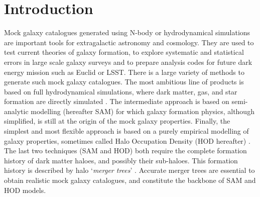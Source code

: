 \section{Introduction}

Mock galaxy catalogues generated using N-body or hydrodynamical
simulations are important tools for extragalactic astronomy and
cosmology.  They are used to test current theories of galaxy
formation, to explore systematic and statistical errors in large scale
galaxy surveys and to prepare analysis codes for future dark energy
mission such as Euclid or LSST.  There is a large variety of methods
to generate such mock galaxy catalogues.  The most ambitious line of
products is based on full hydrodynamical simulations, where dark
matter, gas, and star formation are directly simulated
\citep[e.g.][]{duboisDancingDarkGalactic2014,
  khandaiMassiveBlackIISimulationEvolution2015,
  vogelsbergerPropertiesGalaxiesReproduced2014,
  schayeEAGLEProjectSimulating2015}.
The intermediate approach is based on semi-analytic modelling
(hereafter SAM) \citep[e.g.][]{SA-white,
  SA-durham, SA-Somerville, SA-Kaufmann,
  kangSemianalyticalModelGalaxy2005,crotonManyLivesActive2006} for
which galaxy formation physics, although simplified, is still at the
origin of the mock galaxy properties. Finally, the simplest and most
flexible approach is based on a purely empirical modelling of galaxy
properties, sometimes called Halo Occupation Density (HOD hereafter)
\citep[e.g.][]{HOD-Seljak, HOD-Berlind,
  peacockHaloOccupationNumbers2000,
  bensonNatureGalaxyBias2000,wechslerGalaxyFormationConstraints2001,
  scoccimarroHowManyGalaxies2001}.
The last two techniques (SAM and HOD) both require the complete
formation history of dark matter
haloes, and possibly their sub-haloes. This formation history is
described by halo `\emph{merger trees}'
\citep{roukemaSpectralEvolutionMerging1993,
  roukemaFailureSimpleMerging1993, laceyMergerRatesHierarchical1993}.
Accurate merger trees are essential to obtain realistic mock galaxy
catalogues, and constitute the backbone of SAM and HOD models.



